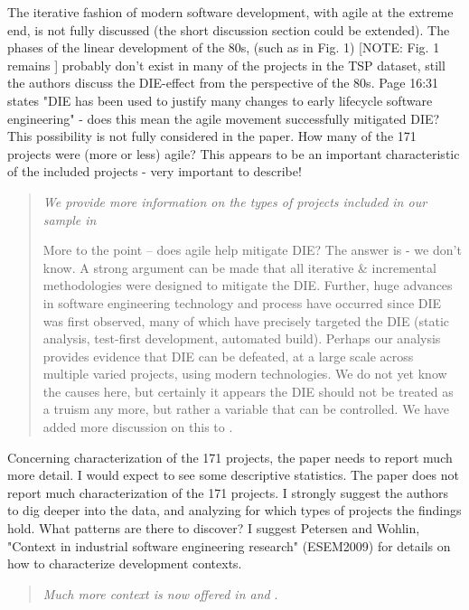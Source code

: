 The iterative fashion of modern software development,
with agile at the extreme end, is not fully discussed (the
short discussion section could be extended). The phases of
the linear development of the 80s, (such as in Fig. 1) [NOTE: Fig. 1 remains ] 
probably don't exist in many of the projects in the TSP
dataset, still the authors discuss the DIE-effect from the
perspective of the 80s. Page 16:31 states "DIE has been used
to justify many changes to early lifecycle software
engineering" - does this mean the agile movement
successfully mitigated DIE? This possibility is not fully
considered in the paper.
How many of the 171 projects were
(more or less) agile? This appears to be an important
characteristic of the included projects - very important to
describe! 

\begin{quote}{\em We provide more information on the types of projects included in our sample in 

More to the point -- does agile help mitigate DIE? The answer is - we don't know. A strong argument can be made that all iterative \& incremental methodologies were designed to mitigate the DIE. Further, huge advances in software engineering technology and process have occurred since DIE was first observed, many of which have precisely targeted the DIE (static analysis, test-first development, automated build). Perhaps our analysis provides evidence that DIE can be defeated, at a large scale across multiple varied projects, using modern technologies. We do not yet know the causes here, but certainly it appears the DIE should not be treated as a truism any more, but rather a variable that can be controlled. We have added more discussion on this to .
}\end{quote}


Concerning characterization of the 171 projects, the
paper needs to report much more detail. I would expect to
see some descriptive statistics.   The paper does not report much
characterization of the 171 projects. I strongly suggest the
authors to dig deeper into the data, and analyzing for which
types of projects the findings hold. What patterns are there
to discover? I suggest Petersen and Wohlin, "Context in
industrial software engineering research" (ESEM2009) for
details on how to characterize development contexts.

\begin{quote}{\em Much more context is now offered in  and }. \end{quote}




